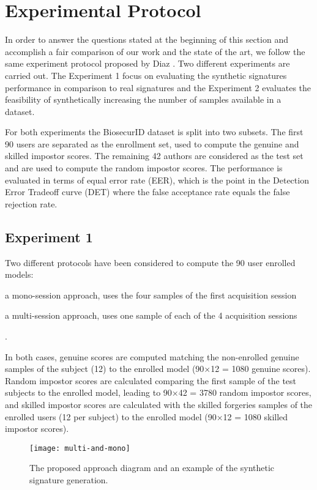 \section{Experimental Protocol}
In order to answer the questions stated at the beginning of this section and accomplish a fair comparison of our work and the state of the art, we follow the same experiment protocol proposed by Diaz \cite{diaz2014generation}. Two different experiments are carried out. The Experiment 1 focus on evaluating the synthetic signatures performance in comparison to real signatures and the Experiment 2 evaluates the feasibility of synthetically increasing the number of samples available in a dataset. 

For both experiments the BiosecurID dataset is split into two subsets. The first 90 users are separated as the enrollment set, used to compute the genuine and skilled impostor scores. The remaining 42 authors are considered as the test set and are used to compute the random impostor scores. The performance is evaluated in terms of equal error rate (EER), which is the point in the Detection Error Tradeoff curve (DET) where the false acceptance rate equals the false rejection rate.

\subsection{Experiment 1}

Two different protocols have been considered to
compute the 90 user enrolled models:
\begin{inlinelist}
  \item a mono-session approach, uses the four samples of the first acquisition session
  \item a multi-session approach, uses one sample of each of the 4 acquisition sessions
\end{inlinelist}.

In both cases, genuine scores are computed matching the non-enrolled genuine samples of the subject (12) to the enrolled model (90×12 = 1080 genuine scores). Random impostor scores are calculated comparing the first sample of the test subjects to the
enrolled model, leading to 90×42 = 3780 random impostor scores, and skilled impostor scores are calculated with the skilled forgeries samples of the enrolled users
(12 per subject) to the enrolled model (90×12 = 1080 skilled impostor scores).

\begin{figure}[!htb]
\centering
\texttt{[image: multi-and-mono]}
\caption{The proposed approach diagram and an example of the synthetic signature generation.}
\label{fig:multiandmono}
\end{figure}

